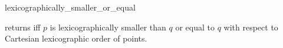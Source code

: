 \begin{ccRefFunction}{lexicographically_smaller_or_equal}


{returns  iff $p$ is lexicographically smaller
 than $q$ or equal to $q$ with respect to Cartesian lexicographic 
 order of points.}

\end{ccRefFunction}

